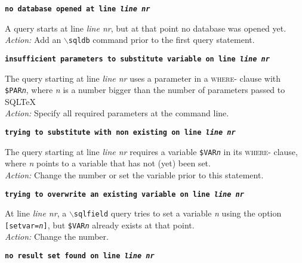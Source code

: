 \documentclass{article}
\newcommand{\bs}{\ensuremath{\backslash}}
\newcommand{\vs}{\vspace{3mm}}
\begin{document}
\vs

\noindent\textbf{\texttt{no database opened at line \textit{line nr}}}

\vspace{1mm}

\noindent A query starts at line \textit{line nr}, but at that point no database was opened yet. \\
\textit{Action:} Add an \texttt{\bs sqldb} command prior to the first query statement.

\vs

\noindent\textbf{\texttt{insufficient parameters to substitute variable on line \textit{line nr}}}

\vspace{1mm}

\noindent The query starting at line \textit{line nr} uses a parameter in a \textsc{where}- clause with
\texttt{\$PAR\textit{n}}, where \textit{n} is a number bigger than the number of parameters
passed to SQL\TeX\. \\
\textit{Action:} Specify all required parameters at the command line.

\vs

\noindent\textbf{\texttt{trying to substitute with non existing on line \textit{line nr}}}

\vspace{1mm}

\noindent The query starting at line \textit{line nr} requires a variable \texttt{\$VAR\textit{n}} in its
\textsc{where}- clause, where \textit{n} points to a variable that has not (yet) been set. \\
\textit{Action:} Change the number or set the variable prior to this statement.

\vs

\noindent\textbf{\texttt{trying to overwrite an existing variable on line \textit{line nr}}}

\vspace{1mm}

\noindent At line \textit{line nr}, a \texttt{\bs sqlfield} query tries to set a variable \textit{n}
using the option \texttt{[setvar=\textit{n}]}, but \texttt{\$VAR\textit{n}} already
exists at that point. \\
\textit{Action:} Change the number.

\vs

\noindent\textbf{\texttt{no result set found on line \textit{line nr}}}

\vspace{1mm}
\end{document}
